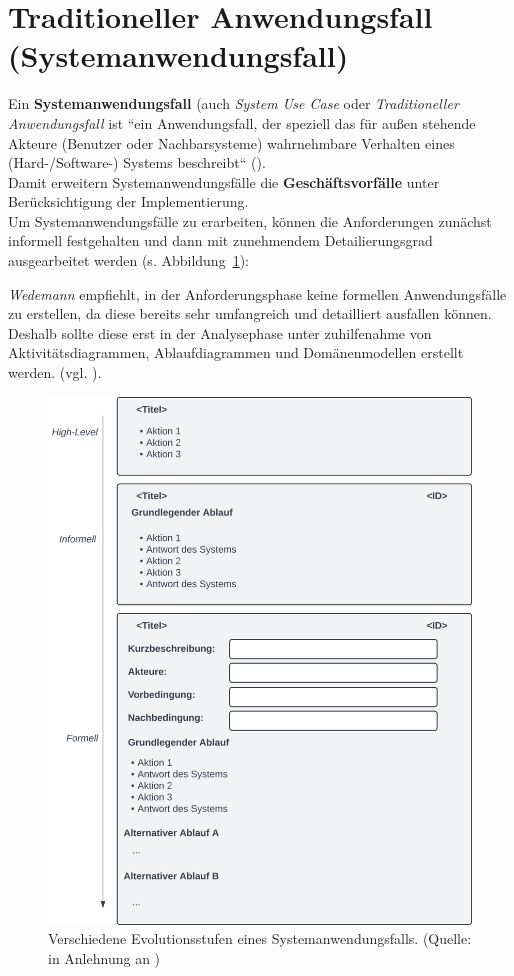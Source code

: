 
\section{Traditioneller Anwendungsfall (Systemanwendungsfall)}


\begin{tcolorbox}[title={Traditioneller Anwendungsfall (Systemanwendungsfall)}]
    Ein \textbf{Systemanwendungsfall} (auch \textit{System Use Case} oder \textit{Traditioneller Anwendungsfall}
    ist ``ein Anwendungsfall, der speziell das für außen stehende Akteure (Benutzer oder Nachbarsysteme) wahrnehmbare Verhalten eines (Hard-/Software-) Systems beschreibt`` (\cite[361]{Oes05}).\\
\noindent
Damit erweitern Systemanwendungsfälle die \textbf{Geschäftsvorfälle} unter Berücksichtigung der Implementierung.\\

\noindent
Um Systemanwendungsfälle zu erarbeiten, können die Anforderungen zunächst informell festgehalten und dann mit zunehmendem Detailierungsgrad ausgearbeitet werden (s. Abbildung~\ref{fig:systemusecase-cc}):

\noindent
\textit{Wedemann} empfiehlt, in der Anforderungsphase keine formellen Anwendungsfälle zu erstellen, da diese bereits sehr umfangreich und detailliert ausfallen können.
Deshalb sollte diese erst in der Analysephase unter zuhilfenahme von Aktivitätsdiagrammen, Ablaufdiagrammen und Domänenmodellen erstellt werden. (vgl. \cite[71]{Wed09}).
\end{tcolorbox}

\begin{figure}
    \centering
    \includegraphics[scale=0.4]{chapters/Anhang/CheatSheets/img/systemusecase}
    \caption{Verschiedene Evolutionsstufen eines Systemanwendungsfalls. (Quelle: in Anlehnung an \cite[Abb. 4.6, 4.7, 4.8]{Wed09})}
    \label{fig:systemusecase-cc}
\end{figure}
